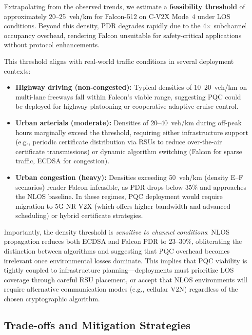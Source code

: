 \documentclass[letterpaper,journal]{IEEEtran}
\begin{document}
Extrapolating from the observed trends, we estimate a \textbf{feasibility threshold} of approximately 20--25~veh/km for Falcon-512 on C-V2X Mode~4 under LOS conditions. Beyond this density, PDR degrades rapidly due to the 4$\times$ subchannel occupancy overhead, rendering Falcon unsuitable for safety-critical applications without protocol enhancements.

This threshold aligns with real-world traffic conditions in several deployment contexts:
\begin{itemize}
    \item \textbf{Highway driving (non-congested):} Typical densities of 10--20~veh/km on multi-lane freeways fall within Falcon's viable range, suggesting PQC could be deployed for highway platooning or cooperative adaptive cruise control.
    \item \textbf{Urban arterials (moderate):} Densities of 20--40~veh/km during off-peak hours marginally exceed the threshold, requiring either infrastructure support (e.g., periodic certificate distribution via RSUs to reduce over-the-air certificate transmissions) or dynamic algorithm switching (Falcon for sparse traffic, ECDSA for congestion).
    \item \textbf{Urban congestion (heavy):} Densities exceeding 50~veh/km (density E--F scenarios) render Falcon infeasible, as PDR drops below 35\% and approaches the NLOS baseline. In these regimes, PQC deployment would require migration to 5G NR-V2X (which offers higher bandwidth and advanced scheduling) or hybrid certificate strategies.
\end{itemize}

Importantly, the density threshold is \emph{sensitive to channel conditions}: NLOS propagation reduces both ECDSA and Falcon PDR to 23--30\%, obliterating the distinction between algorithms and suggesting that PQC overhead becomes irrelevant once environmental losses dominate. This implies that PQC viability is tightly coupled to infrastructure planning---deployments must prioritize LOS coverage through careful RSU placement, or accept that NLOS environments will require alternative communication modes (e.g., cellular V2N) regardless of the chosen cryptographic algorithm.

\subsection{Trade-offs and Mitigation Strategies}
\end{document}
